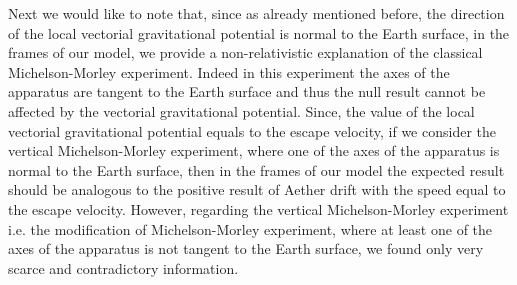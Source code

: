 \documentclass{article}
\theoremstyle{definition}
\theoremstyle{remark}
\begin{document}
Next we would like to note that, since as already mentioned before,
the direction of the local vectorial gravitational potential is
normal to the Earth surface, in the frames of our model, we provide
a non-relativistic explanation of the classical Michelson-Morley
experiment. Indeed in this experiment the axes of the apparatus are
tangent to the Earth surface and thus the null result cannot be
affected by the vectorial gravitational potential. Since, the value
of the local vectorial gravitational potential equals to the escape
velocity, if we consider the vertical Michelson-Morley experiment,
where one of the axes of the apparatus is normal to the Earth
surface, then in the frames of our model the expected result should
be analogous to the positive result of Aether drift with the speed
equal to the escape velocity. However, regarding the vertical
Michelson-Morley experiment i.e. the modification of
Michelson-Morley experiment, where at least one of the axes of the
apparatus is not tangent to the Earth surface, we found only very
scarce and contradictory information.
\end{document}
